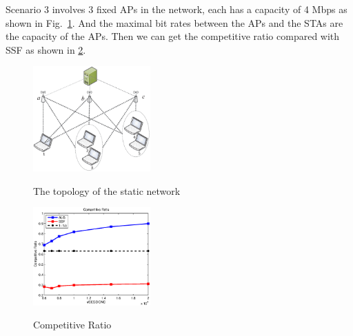\documentclass[conference]{IEEEtran}
\def\figwidth{0.4\textwidth}
\begin{document}
  Scenario 3 involves 3 fixed APs in the network, each has a capacity of 4 Mbps as shown in Fig.~\ref{fig:topology_static}.  And the maximal bit rates between the APs and the STAs are the capacity of the APs.  Then we can get the competitive ratio compared with SSF as shown in \ref{fig:competitive_ratio}.
  \begin{figure}[!ht]
    \centering
    \includegraphics[width=\figwidth]{Topology_Static.eps}\\
    \caption{The topology of the static network}\label{fig:topology_static}
  \end{figure}
  \begin{figure}[!ht]
    \centering
    \includegraphics[width=\figwidth]{Competitive_Ratio.eps}\\
    \caption{Competitive Ratio }\label{fig:competitive_ratio}
  \end{figure}
\end{document}
